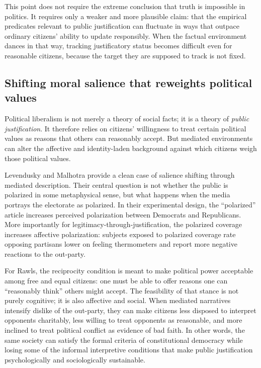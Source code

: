 \documentclass[12pt]{report}
\begin{document}
This point does not require the extreme conclusion that truth is impossible in politics. It requires only a weaker and more plausible claim: that the empirical predicates relevant to public justification can fluctuate in ways that outpace ordinary citizens’ ability to update responsibly. When the factual environment dances in that way, tracking justificatory status becomes difficult even for reasonable citizens, because the target they are supposed to track is not fixed.

\subsection{Shifting moral salience that reweights political values}\label{sec:ch5-salience}

Political liberalism is not merely a theory of social facts; it is a theory of \emph{public justification}. It therefore relies on citizens’ willingness to treat certain political values as reasons that others can reasonably accept. But mediated environments can alter the affective and identity-laden background against which citizens weigh those political values.

Levendusky and Malhotra provide a clean case of salience shifting through mediated description. Their central question is not whether the public is polarized in some metaphysical sense, but what happens when the media portrays the electorate as polarized. In their experimental design, the \enquote{polarized} article increases perceived polarization between Democrats and Republicans.\parencite[p.~290]{levenduskyMalhotra2016polarization} More importantly for legitimacy-through-justification, the polarized coverage increases affective polarization: subjects exposed to polarized coverage rate opposing partisans lower on feeling thermometers and report more negative reactions to the out-party.\parencite[p.~292]{levenduskyMalhotra2016polarization}

For Rawls, the reciprocity condition is meant to make political power acceptable among free and equal citizens: one must be able to offer reasons one can \enquote{reasonably think} others might accept.\parencite[p.~771]{rawls1997public} The feasibility of that stance is not purely cognitive; it is also affective and social. When mediated narratives intensify dislike of the out-party, they can make citizens less disposed to interpret opponents charitably, less willing to treat opponents as reasonable, and more inclined to treat political conflict as evidence of bad faith. In other words, the same society can satisfy the formal criteria of constitutional democracy while losing some of the informal interpretive conditions that make public justification psychologically and sociologically sustainable.
\end{document}
